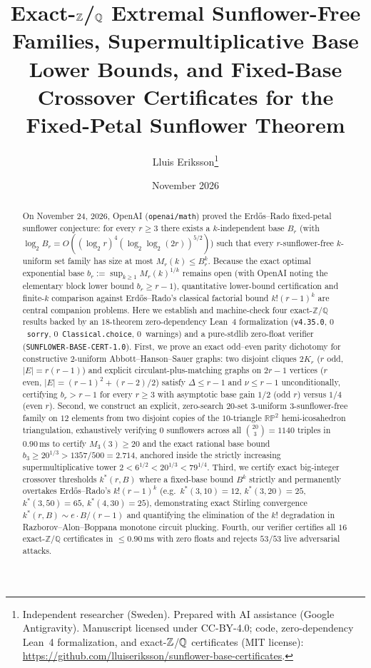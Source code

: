 \documentclass[11pt,a4paper]{article}
\title{\bfseries Exact-$\ZZ$/$\QQ$ Extremal Sunflower-Free Families, Supermultiplicative Base Lower Bounds, and Fixed-Base Crossover Certificates for the Fixed-Petal Sunflower Theorem}
\author{Lluis Eriksson\thanks{Independent researcher (Sweden). Prepared with AI assistance (Google Antigravity). Manuscript licensed under CC-BY-4.0; code, zero-dependency Lean~4 formalization, and exact-$\ZZ$/$\QQ$ certificates (MIT license):\\ \url{https://github.com/lluiseriksson/sunflower-base-certificates}.}}
\date{November 2026}
\theoremstyle{definition}
\theoremstyle{remark}
\newcommand{\QQ}{\mathbb{Q}}
\newcommand{\ZZ}{\mathbb{Z}}
\newcommand{\RP}{\mathbb{RP}}
\newcommand{\certschema}{\texttt{SUNFLOWER-BASE-CERT-1.0}}
\begin{document}
\maketitle

\begin{abstract}
On November 24, 2026, OpenAI (\texttt{openai/math}) proved the Erd\H{o}s--Rado fixed-petal sunflower conjecture: for every $r \ge 3$ there exists a $k$-independent base $B_r$ (with $\log_2 B_r = O((\log_2 r)^4 (\log_2\log_2(2r))^{5/2})$) such that every $r$-sunflower-free $k$-uniform set family has size at most $M_r(k) \le B_r^k$. Because the exact optimal exponential base $b_r := \sup_{k \ge 1} M_r(k)^{1/k}$ remains open (with OpenAI noting the elementary block lower bound $b_r \ge r - 1$), quantitative lower-bound certification and finite-$k$ comparison against Erd\H{o}s--Rado's classical factorial bound $k!(r-1)^k$ are central companion problems. Here we establish and machine-check four exact-$\ZZ$/$\QQ$ results backed by an $18$-theorem zero-dependency Lean~4 formalization (\texttt{v4.35.0}, $0$~\texttt{sorry}, $0$~\texttt{Classical.choice}, $0$~warnings) and a pure-stdlib zero-float verifier (\certschema{}). First, we prove an exact odd--even parity dichotomy for constructive $2$-uniform Abbott--Hanson--Sauer graphs: two disjoint cliques $2K_r$ ($r$ odd, $|E|=r(r-1)$) and explicit circulant-plus-matching graphs on $2r-1$ vertices ($r$ even, $|E|=(r-1)^2+(r-2)/2$) satisfy $\Delta \le r-1$ and $\nu \le r-1$ unconditionally, certifying $b_r > r-1$ for every $r \ge 3$ with asymptotic base gain $1/2$ (odd $r$) versus $1/4$ (even $r$). Second, we construct an explicit, zero-search $20$-set $3$-uniform $3$-sunflower-free family on $12$ elements from two disjoint copies of the $10$-triangle $\RP^2$ hemi-icosahedron triangulation, exhaustively verifying $0$ sunflowers across all $\binom{20}{3}=1140$ triples in $0.90\,\mathrm{ms}$ to certify $M_3(3) \ge 20$ and the exact rational base bound $b_3 \ge 20^{1/3} > 1357/500 = 2.714$, anchored inside the strictly increasing supermultiplicative tower $2 < 6^{1/2} < 20^{1/3} < 79^{1/4}$. Third, we certify exact big-integer crossover thresholds $k^*(r, B)$ where a fixed-base bound $B^k$ strictly and permanently overtakes Erd\H{o}s--Rado's $k!(r-1)^k$ (e.g.\ $k^*(3,10)=12$, $k^*(3,20)=25$, $k^*(3,50)=65$, $k^*(4,30)=25$), demonstrating exact Stirling convergence $k^*(r,B) \sim e \cdot B/(r-1)$ and quantifying the elimination of the $k!$ degradation in Razborov--Alon--Boppana monotone circuit plucking. Fourth, our verifier certifies all $16$ exact-$\ZZ$/$\QQ$ certificates in $\le 0.90\,\mathrm{ms}$ with zero floats and rejects $53/53$ live adversarial attacks.
\end{abstract}
\end{document}
